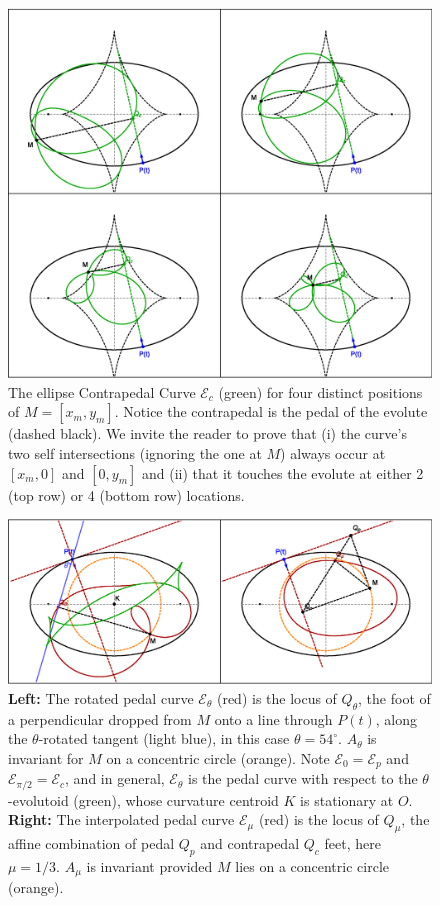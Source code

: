 \begin{figure}
    \centering
    \includegraphics[width=\textwidth]{pics/0050_contrapedal_touchpts.eps}
    \caption{The ellipse Contrapedal Curve $\mathcal{E}_c$ (green) for four distinct positions of $M=[x_m,y_m]$. Notice the contrapedal is the pedal of the evolute (dashed black). We invite the reader to prove that (i) the curve's two self intersections (ignoring the one at $M$) always occur at $[x_m,0]$ and $[0,y_m]$ and (ii) that it touches the evolute at either 2 (top row) or 4 (bottom row) locations.}
    \label{fig:contrapedal}
\end{figure}

\begin{figure}
    \centering
    \includegraphics[width=\textwidth]{pics/0030_rot_mid.eps}
    \caption{\textbf{Left:} The rotated pedal curve $\mathcal{E}_{\theta}$ (red) is the locus of $Q_{\theta}$, the foot of a perpendicular dropped from $M$ onto a line through $P(t)$, along the $\theta$-rotated tangent (light blue), in this case $\theta=54^\circ$. $A_{\theta}$ is invariant for $M$ on a concentric circle (orange). Note $\mathcal{E}_0=\mathcal{E}_p$ and  $\mathcal{E}_{\pi/2}=\mathcal{E}_c$, and in general, $\mathcal{E}_\theta$ is the pedal curve with respect to the $\theta$-evolutoid (green), whose curvature centroid $K$ is stationary at $O$. \textbf{Right:} The interpolated pedal curve $\mathcal{E}_{\mu}$ (red) is the locus of $Q_{\mu}$, the affine combination of pedal $Q_p$ and contrapedal $Q_c$ feet, here $\mu=1/3$. $A_{\mu}$ is invariant provided $M$ lies on a concentric circle (orange).}
    \label{fig:theta-mu}
\end{figure}

